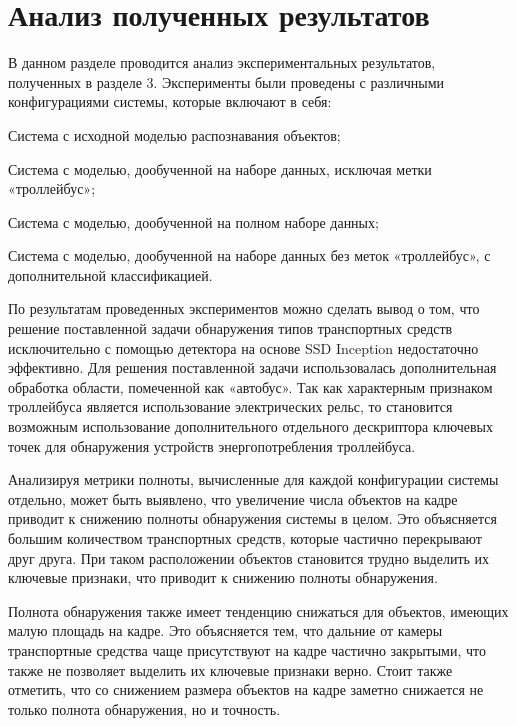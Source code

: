 \chapter{Анализ полученных результатов}

В данном разделе проводится анализ экспериментальных результатов, полученных в разделе 3. Эксперименты были проведены с различными конфигурациями системы, которые включают в себя:

%
\begin{itemize*}
  \item Система с исходной моделью распознавания объектов;
  \item Система с моделью, дообученной на наборе данных, исключая метки «троллейбус»;
  \item Система с моделью, дообученной на полном наборе данных;
  \item Система с моделью, дообученной на наборе данных без меток «троллейбус», с дополнительной классификацией.
\end{itemize*}
%

По результатам проведенных экспериментов можно сделать вывод о том, что решение поставленной задачи обнаружения типов транспортных средств исключительно с помощью детектора на основе SSD Inception недостаточно эффективно. Для решения поставленной задачи использовалась дополнительная обработка области, помеченной как «автобус». Так как характерным признаком троллейбуса является использование электрических рельс, то становится возможным использование дополнительного отдельного дескриптора ключевых точек для обнаружения устройств энергопотребления троллейбуса. 

Анализируя метрики полноты, вычисленные для каждой конфигурации системы отдельно, может быть выявлено, что увеличение числа объектов на кадре приводит к снижению полноты обнаружения системы в целом. Это объясняется большим количеством транспортных средств, которые частично перекрывают друг друга. При таком расположении объектов становится трудно выделить их ключевые признаки, что приводит к снижению полноты обнаружения. 

Полнота обнаружения также имеет тенденцию снижаться для объектов, имеющих малую площадь на кадре. Это объясняется тем, что дальние от камеры транспортные средства чаще присутствуют на кадре частично закрытыми, что также не позволяет выделить их ключевые признаки верно. Стоит также отметить, что со снижением размера объектов на кадре заметно снижается не только полнота обнаружения, но и точность. 

